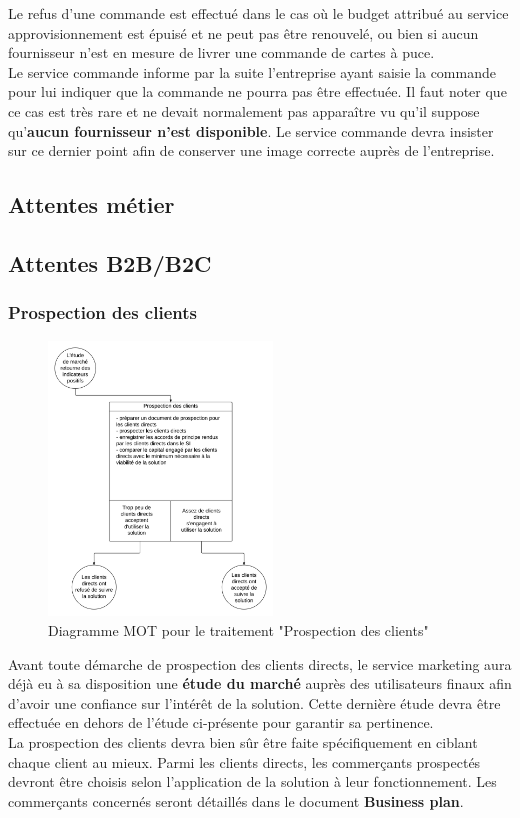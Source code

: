 Le refus d'une commande est effectué dans le cas où le budget attribué au
service approvisionnement est épuisé et ne peut pas être renouvelé, ou bien si
aucun fournisseur n'est en mesure de livrer une commande de cartes à puce. \\

Le service commande informe par la suite l'entreprise ayant saisie la commande
pour lui indiquer que la commande ne pourra pas être effectuée. Il faut noter
que ce cas est très rare et ne devait normalement pas apparaître vu qu'il
suppose qu'\textbf{aucun fournisseur n'est disponible}. Le service commande
devra insister sur ce dernier point afin de conserver une image correcte auprès
de l'entreprise.

\subsection{Attentes métier}
\subsection{Attentes B2B/B2C}

\subsubsection{Prospection des clients}

\begin{figure}
    \centering
    \includegraphics[width=0.53\textwidth]{mot-prospection-clients}
    \caption{Diagramme MOT pour le traitement "Prospection des clients"}
    \label{fig:mot-prospection-clients}
\end{figure}

Avant toute démarche de prospection des clients directs, le service marketing
aura déjà eu à sa disposition une \textbf{étude du marché} auprès des
utilisateurs finaux afin d'avoir une confiance sur l'intérêt de la solution.
Cette dernière étude devra être effectuée en dehors de l'étude ci-présente pour
garantir sa pertinence. \\

La prospection des clients devra bien sûr être faite spécifiquement en ciblant
chaque client au mieux. Parmi les clients directs, les commerçants prospectés
devront être choisis selon l'application de la solution à leur fonctionnement.
Les commerçants concernés seront détaillés dans le document \textbf{Business
plan}.


